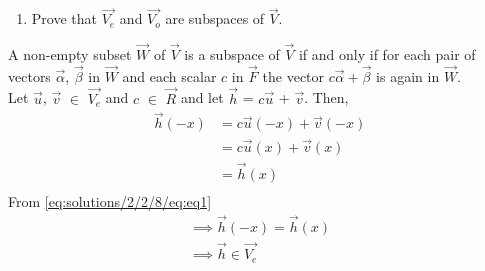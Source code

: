  \begin{enumerate}
   \item Prove that $\vec{V_e}$ and $\vec{V_o}$ are subspaces of $\vec{V}$.
 \end{enumerate}

A non-empty subset $\vec{W}$ of $\vec{V}$ is a subspace of $\vec{V}$ if and only if for each pair of vectors $\vec{\alpha}$, $\vec{\beta}$ in $\vec{W}$ and each scalar $c$ in $\vec{F}$ the vector $c\vec{\alpha}+\vec{\beta}$ is again in $\vec{W}$.\\

Let $\vec{u}$, $\vec{v}$ $\in$ $\vec{V_e}$ and $c$ $\in$ $\vec{R}$ and let $\vec{h}$ = $c\vec{u}$ + $\vec{v}$. Then,
\begin{equation} \label{eq:solutions/2/2/8/eq:eq1}
\begin{split}
\vec{h}(-x) &= c \vec{u}(-x) + \vec{v}(-x)\\
 & = c \vec{u}(x) + \vec{v}(x)\\
& = \vec{h}(x)\\
\end{split}
\end{equation}
From \eqref{eq:solutions/2/2/8/eq:eq1}
\begin{align}
\implies \vec{h}(-x) = \vec{h}(x)\\
\implies \vec{h} \in \vec{V_e} \label{eq:solutions/2/2/8/eq:eq2}
\end{align}

